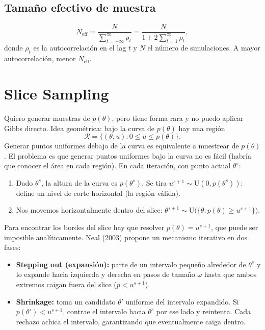 \documentclass[11pt]{article}
\theoremstyle{definition}
\begin{document}
\subsection{Tamaño efectivo de muestra}
\[
N_{\text{eff}}=\frac{N}{\sum_{t=-\infty}^{\infty}\rho_t}=\frac{N}{1+2\sum_{t=1}^{\infty}\rho_t},
\]
donde $\rho_t$ es la autocorrelación en el lag $t$ y $N$ el número de simulaciones. A mayor autocorrelación, menor $N_{\text{eff}}$.

\section{Slice Sampling}
Quiero generar muestras de $p(\theta)$, pero tiene forma rara y no puedo aplicar Gibbs directo. Idea geométrica: bajo la curva de $p(\theta)$ hay una región
\[
\mathcal{R}=\{(\theta,u):0\le u\le p(\theta)\}.
\]
Generar puntos uniformes debajo de la curva es equivalente a muestrear de $p(\theta)$. El problema es que generar puntos uniformes bajo la curva no es fácil (habría que conocer el área en cada región). En cada iteración, con punto actual $\theta^s$:
\begin{enumerate}[leftmargin=2em]
  \item Dado $\theta^s$, la altura de la curva es $p(\theta^s)$. Se tira $u^{s+1}\sim\text{U}(0,p(\theta^s))$: define un nivel de corte horizontal (la región válida).
  \item Nos movemos horizontalmente dentro del slice: $\theta^{s+1}\sim\text{U}\big(\{\theta:p(\theta)\ge u^{s+1}\}\big)$.
\end{enumerate}
Para encontrar los bordes del slice hay que resolver $p(\theta)=u^{s+1}$, que puede ser imposible analíticamente. Neal (2003) propone un mecanismo iterativo en dos fases:
\begin{itemize}[leftmargin=2em]
  \item \textbf{Stepping out (expansión):} parte de un intervalo pequeño alrededor de $\theta^s$ y lo expande hacia izquierda y derecha en pasos de tamaño $\omega$ hasta que ambos extremos caigan fuera del slice ($p<u^{s+1}$).
  \item \textbf{Shrinkage:} toma un candidato $\theta'$ uniforme del intervalo expandido. Si $p(\theta')<u^{s+1}$, contrae el intervalo hacia $\theta^s$ por ese lado y reintenta. Cada rechazo achica el intervalo, garantizando que eventualmente caiga dentro.
\end{itemize}
\end{document}
